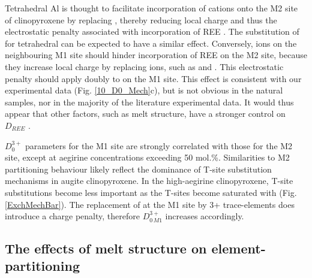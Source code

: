 \documentclass[review,authoryear,12pt]{elsarticle}
\begin{document}
	Tetrahedral Al is thought to facilitate incorporation of  cations onto the M2 site of clinopyroxene by replacing , thereby reducing local charge and thus the electrostatic penalty associated with incorporation of REE \citep{Blundy1998}.
     The substitution of  for tetrahedral  can be expected to have a similar effect. Conversely,  ions on the neighbouring M1 site should hinder incorporation of REE on the M2 site, because they increase local charge by replacing  ions, such as  and . This electrostatic penalty should apply doubly to  on the M1 site. This effect is consistent with our experimental data (Fig. \ref{10_D0_Mech}c), but is not obvious in the natural samples, nor in the majority of the literature experimental data. It would thus appear that other factors, such as melt structure, have a stronger control on $D_{REE}$ \citep[e.g.][]{Prowatke2005}.


	$D_0^{3+}$ parameters for the M1 site are strongly correlated with those for the M2 site, except at aegirine concentrations exceeding 50 mol.\%. Similarities to M2 partitioning behaviour likely reflect the dominance of T-site substitution mechanisms in augite clinopyroxene. In the high-aegirine clinopyroxene, T-site substitutions become less important as the T-sites become saturated with  (Fig. \ref{ExchMechBar}). The replacement of  at the M1 site by 3+ trace-elements does introduce a charge penalty, therefore $D_{0\, M1}^{3+}$ increases accordingly.
  

\subsection{The effects of melt structure on element-partitioning}
\end{document}
